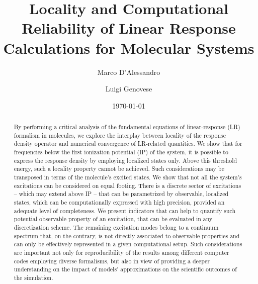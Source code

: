 \documentclass[reprint,aps,prb]{revtex4-1}
\begin{document}


\title{Locality and Computational Reliability of Linear Response Calculations for Molecular Systems}
\author{Marco D'Alessandro}
\author{Luigi Genovese}
\date{\today}

\begin{abstract}
By performing a critical analysis of the fundamental equations of linear-response (LR) formalism in molecules,
we explore the interplay between locality of the response density operator and  numerical convergence of LR-related quantities.
We show that for frequencies below the first ionization potential (IP) of the system, it is possible to express the response density by employing localized states only.
Above this threshold energy, such a locality property cannot be achieved.
Such considerations may be transposed in terms of the molecule's excited states. We show that not all the system's excitations can be considered on equal footing.
There is a discrete sector of excitations -- which may extend above IP -- that can be parametrized by observable, localized states, which can be computationally expressed with high precision, provided an adequate level of completeness.
We present indicators that can help to quantify such potential observable property of an excitation, that can be evaluated
in any discretization scheme.
The remaining excitation modes belong to a continuum spectrum that, on the contrary, is not directly associated to observable properties and can only be effectively represented in a given computational setup.
Such considerations are important not only for reproducibility of the results among different computer codes
employing diverse formalisms, but also in view of providing a deeper understanding on the impact of models'
approximations on the scientific outcomes of the simulation.
\end{abstract}

\maketitle
\end{document}
